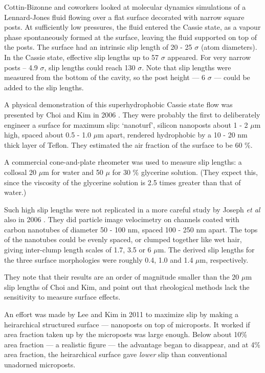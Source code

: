 \documentclass[12pt, a4paper, twoside, openright]{book}
\begin{document}
Cottin-Bizonne and coworkers looked at molecular dynamics simulations of a Lennard-Jones fluid flowing over a flat surface decorated with narrow square posts.  At sufficiently low pressures, the fluid entered the Cassie state, as a vapour phase spontaneously formed at the surface, leaving the fluid supported on top of the posts.  The surface had an intrinsic slip length of 20 - 25 $\sigma$ (atom diameters).  In the Cassie state, effective slip lengths up to 57 $\sigma$ appeared.  For very narrow posts -- 4.9 $\sigma$, slip lengths could reach 130 $\sigma$.  Note that slip lengths were measured from the bottom of the cavity, so the post height --- 6 $\sigma$ --- could be added to the slip lengths.

\vspace{1em}
A physical demonstration of this superhydrophobic Cassie state flow was presented by Choi and Kim in 2006 \cite{ChoiKim2006}.  They were probably the first to deliberately engineer a surface for maximum slip: `nanoturf', silicon nanoposts about 1 - 2 $\mu$m high, spaced about 0.5 - 1.0 $\mu$m apart, rendered hydrophobic by a 10 - 20 nm thick layer of Teflon.  They estimated the air fraction of the surface to be 60 \%.

A commercial cone-and-plate rheometer was used to measure slip lengths: a collosal 20 $\mu$m for water and 50 $\mu$ for 30 \% glycerine solution.  (They expect this, since the viscosity of the glycerine solution is 2.5 times greater than that of water.)

\vspace*{1em}
Such high slip lengths were not replicated in a more careful study by Joseph \emph{et al} also in 2006 \cite{Joseph2006}.  They did particle image velocimetry on channels coated with carbon nanotubes of diameter 50 - 100 nm, spaced 100 - 250 nm apart.  The tops of the nanotubes could be evenly spaced, or clumped together like wet hair, giving inter-clump length scales of 1.7, 3.5 or 6 $\mu$m.  The derived slip lengths for the three surface morphologies were roughly 0.4, 1.0 and 1.4 $\mu$m, respectively.

They note that their results are an order of magnitude smaller than the 20 $\mu$m slip lengths of Choi and Kim, and point out that rheological methods lack the sensitivity to measure surface effects.

An effort was made by Lee and Kim in 2011 \cite{LeeKim2011} to maximize slip by making a heirarchical structured surface --- nanoposts on top of microposts.  It worked if area fraction taken up by the microposts was large enough.  Below about 10\% area fraction --- a realistic figure --- the advantage began to disappear, and at 4\% area fraction, the heirarchical surface gave \emph{lower} slip than conventional unadorned microposts.
\end{document}
